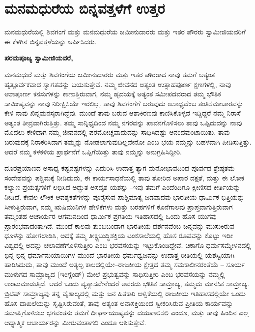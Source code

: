 
\chapter{ಮನಮಧುರೆಯ ಬಿನ್ನವತ್ತಳೆಗೆ ಉತ್ತರ}

ಮನಮಧುರೆಯಲ್ಲಿ ಶಿವಗಂಗೆ ಮತ್ತು ಮನಮಧುರೆಯ ಜಮೀನುದಾರರು ಮತ್ತು ಇತರ ಪೌರರು ಸ್ವಾಮೀಜಿಯವರಿಗೆ ಈ ಕೆಳಗಿನ ಬಿನ್ನವತ್ತಳೆಯನ್ನು ಅರ್ಪಿಸಿದರು.

\textbf{ಪರಮಪೂಜ್ಯ ಸ್ವಾಮೀಜಿಯವರೆ,}

ಮನಮಧುರೆ ಮತ್ತು ಶಿವಗಂಗೆಯ ಜಮೀನುದಾರರು ಮತ್ತು ಇತರ ಪೌರರಾದ ನಾವು ತಮಗೆ ಅತ್ಯಂತ ಹೃತ್ಪೂರ್ವಕವಾದ ಸ್ವಾಗತವನ್ನು ಬಯಸುತ್ತೇವೆ. ನಮ್ಮ ಜೀವನದ ಅತ್ಯಂತ ಉತ್ಸಾಹಪೂರ್ಣ ಕ್ಷಣಗಳಲ್ಲಿ, ನಾವು ಆಶಾಪೂರ್ಣ ಕನಸುಗಳನ್ನು ಕಾಣುತ್ತಿರುವಾಗ, ನಮ್ಮ ಹೃದಯಕ್ಕೆ ಅತ್ಯಂತ ಸಮೀಪದವರಾದ ತಮ್ಮ ಭೌತಿಕ ಸಾಮೀಪ್ಯವನ್ನು ನಾವು ನಿರೀಕ್ಷಿಸಿಯೇ ಇರಲಿಲ್ಲ. ತಾವು ಶಿವಗಂಗೆಗೆ ಬರುವುದು ಅಸಾಧ್ಯವೆಂಬ ತಂತಿಸಮಾಚಾರವನ್ನು ಕೇಳಿ ನಾವು ಖಿನ್ನಮನಸ್ಕರಾಗಿದ್ದೆವು. ಮುಂದೆ ತಾವು ಬರುವ ಆಶಾಕಿರಣವು ಕಾಣಿಸಿಕೊಳ್ಳದೆ ಇದ್ದಿದ್ದರೆ ನಮ್ಮ ನಿರಾಸೆ ಅತ್ಯಂತ ತೀವ್ರವಾಗಿರುತ್ತಿತ್ತು. ತಮ್ಮ ಸಾನ್ನಿಧ್ಯದಿಂದ ನಮ್ಮ ನಗರವನ್ನು ಪಾವನಗೊಳಿಸಲು ತಾವು ಒಪ್ಪಿದುದನ್ನು ನಾವು ಮೊದಲು ಕೇಳಿದಾಗ ನಮ್ಮ ಜೀವನದಲ್ಲಿ ಪರಮೋಚ್ಚವಾದುದನ್ನು ಸಾಧಿಸಿದಷ್ಟು ಆನಂದವುಂಟಾಯಿತು. ತಾವು ಬರುವುದಕ್ಕೆ ನಿರಾಕರಿಸಿದಾಗ ತಮ್ಮನ್ನು ನೋಡಲಾಗುವುದಿಲ್ಲವೇನೋ ಎಂಬ ಭಯ ನಮ್ಮನ್ನು ಬಹಳವಾಗಿ ಪೀಡಿಸುತ್ತಿತ್ತು. ಆದರೆ ನಮ್ಮ ಕಳಕಳಿಯ ಪ್ರಾರ್ಥನೆಗೆ ಒಪ್ಪಿಗೆಯಿತ್ತು ತಾವು ನಮ್ಮನ್ನು ಅನುಗ್ರಹಿಸಿದ್ದೀರಿ.

ದೂರಪ್ರಯಾಣದ ಅಸಾಧ್ಯ ಕಷ್ಟನಷ್ಟಗಳನ್ನು ಎದುರಿಸಿ ಉದಾತ್ತ ತ್ಯಾಗ ಮನೋಭಾವದಿಂದ ಪೂರ್ವದ ಶ್ರೇಷ್ಠತಮ ಸಂದೇಶವನ್ನು ಪಶ್ಚಿಮಕ್ಕೆ ನೀಡಿದುದು, ಈ ಕಾರ್ಯಸಾಧನೆಯಲ್ಲಿ ತಾವು ತೋರಿದ ಅಪಾರ ದಕ್ಷತೆ, ಮತ್ತು ಈ ಲೋಕ ಕಲ್ಯಾಣ ಪ್ರಯತ್ನಗಳಿಗೆ ಲಭಿಸಿದ ಅದ್ಭುತ ಅಸದೃಶ ಯಶಸ್ಸು –ಇವು ತಮಗೆ ಎಂದೆಂದಿಗೂ ಕ್ಷೀಣಿಸದ ಕೀರ್ತಿಯನ್ನು ನೀಡಿದೆ. ಕೇವಲ ಲೌಕಿಕ ಆವಶ್ಯಕತೆಗಳನ್ನು ಪೂರೈಸುವ ಪಾಶ್ಚಿಮಾತ್ಯ ಜಡವಾದವು ಭಾರತೀಯ ಧಾರ್ಮಿಕ ಭಿತ್ತಿಯನ್ನು ಸೀಳುತ್ತಿರುವಾಗ, ನಮ್ಮ ಋಷಿಮುನಿಗಳ ಹೇಳಿಕೆಗಳು ಮತ್ತು ಬರಹ\-ಗಳಿಗೆ ಕೊನೆಗಾಲವು ಪ್ರಾಪ್ತವಾಗುತ್ತಿರುವಾಗ ತಮ್ಮಂತಹ ಆಚಾರ್ಯರ ಆಗಮನದಿಂದ ಧಾರ್ಮಿಕ ಪ್ರಗತಿಯ ಇತಿಹಾಸದಲ್ಲಿ ಒಂದು ಹೊಸ ಯುಗವು ಪ್ರಾರಂಭವಾದಂತಾಗಿದೆ. ಮುಂದೆ ಕಾಲವು ತುಂಬಿಬಂದಾಗ ಭಾರತೀಯ ದರ್ಶನವೆಂಬ ಚಿನ್ನವನ್ನು ಮುಸುಕಿರುವ ಧೂಳನ್ನು ಹೋಗಲಾಡಿಸಿ, ಅದಕ್ಕೆ ತಮ್ಮ ತೀಕ್ಷ್ಣಬುದ್ಧಿಶಕ್ತಿಯ ಟಂಕಸಾಲೆಯಲ್ಲಿ ಹೊಸ ರೂಪವನ್ನು ಕೊಟ್ಟು ಇಡೀ ವಿಶ್ವದಲ್ಲಿ ಅದನ್ನು ಚಲಾವಣೆಗೊಳಿಸುತ್ತೀರಿ ಎಂಬ ಭರವಸೆಯನ್ನು ಇಟ್ಟುಕೊಂಡಿದ್ದೇವೆ. ಚಿಕಾಗೊ ಧರ್ಮಸಮ್ಮೇಳನದಲ್ಲಿ ಭಿನ್ನ ಭಿನ್ನ ಧರ್ಮಾನುಯಾಯಿಗಳ ಮುಂದೆ ಭಾರತೀಯ ಧರ್ಮಧ್ವಜವನ್ನು ಉದಾತ್ತ ರೀತಿಯಲ್ಲಿ ಯಶಸ್ವಿಯಾಗಿ ಹಾರಿಸಿದುದು, ತಾವು ಮುಂದೆ ಅತ್ಯಲ್ಪ ಕಾಲದಲ್ಲಿಯೇ–ರಾಜಕೀಯ ಕ್ಷೇತ್ರದ ತಮ್ಮ ಸಮಕಾಲೀನರಂತೆಯೆ – ಸೂರ್ಯ ಮುಳುಗದ ಸಾಮ್ರಾಜ್ಯದ (ಇಂಗ್ಲೆಂಡ್​) ಮೇಲೆ ಪ್ರಭುತ್ವವನ್ನು ಸಾಧಿಸುತ್ತೀರಿ ಎಂಬ ಭರವಸೆಯನ್ನು ನಮ್ಮಲ್ಲಿ ಉಂಟುಮಾಡುತ್ತಿದೆ. ಆದರೆ ಒಂದು ವ್ಯತ್ಯಾಸವೇನೆಂದರೆ ಅವರದು ಭೌತಿಕ ಸಾಮ್ರಾಜ್ಯ, ತಮ್ಮದು ಮಾನಸಿಕ ಸಾಮ್ರಾಜ್ಯ. ಬ್ರಿಟಿಷ್​ ಸಾಮ್ರಾಜ್ಯವು ತನ್ನ ವೈಶಾಲ್ಯದಲ್ಲಿ ಮತ್ತು ಜನ ಹಿತಕಾರಿ ಆಳ್ವಿಕೆಯಲ್ಲಿ ರಾಜಕೀಯ\- ಇತಿಹಾಸದಲ್ಲಿಯೇ ಒಂದು ಹೊಸ ದಾಖಲೆಯನ್ನು ಸೃಷ್ಟಿಸಿರುವಂತೆ, ತಾವು ಅತ್ಯಂತ ಅನಾಸಕ್ತಿಯಿಂದ ಸ್ವೀಕರಿಸಿರುವ ಪ್ರೀತಿಯ ಕಾರ್ಯವನ್ನು ಸಮಾಪ್ತಿಗೊಳಿಸಲು ಭಗವಂತನು ತಮಗೆ ದೀರ್ಘಾಯುಷ್ಯವನ್ನು ದಯಪಾಲಿಸಲಿ ಎಂದೂ, ಮತ್ತು ತಾವು ಹಿಂದಿನ ಎಲ್ಲ ಆಧ್ಯಾತ್ಮಿಕ ಆಚಾರ್ಯರನ್ನು ಮೀರುವಂತಾಗಲಿ ಎಂದೂ ಆಶಿಸುತ್ತೇವೆ.

